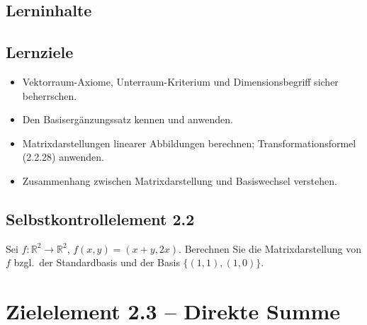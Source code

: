 \documentclass[a4paper,12pt]{article}
\begin{document}
\subsection*{Lerninhalte}
\begin{center}
\end{center}

\subsection*{Lernziele}
\begin{itemize}
  \item Vektorraum-Axiome, Unterraum-Kriterium und Dimensionsbegriff sicher beherrschen.
  \item Den Basisergänzungssatz kennen und anwenden.
  \item Matrixdarstellungen linearer Abbildungen berechnen; Transformationsformel (2.2.28) anwenden.
  \item Zusammenhang zwischen Matrixdarstellung und Basiswechsel verstehen.
\end{itemize}

\subsection*{Selbstkontrollelement 2.2}
Sei $f : \mathbb{R}^2 \to \mathbb{R}^2$, $f(x,y) = (x+y, 2x)$. Berechnen Sie die Matrixdarstellung von $f$ bzgl.\ der Standardbasis und der Basis $\{(1,1),(1,0)\}$.

\newpage

\section*{Zielelement 2.3 -- Direkte Summe}
\end{document}
